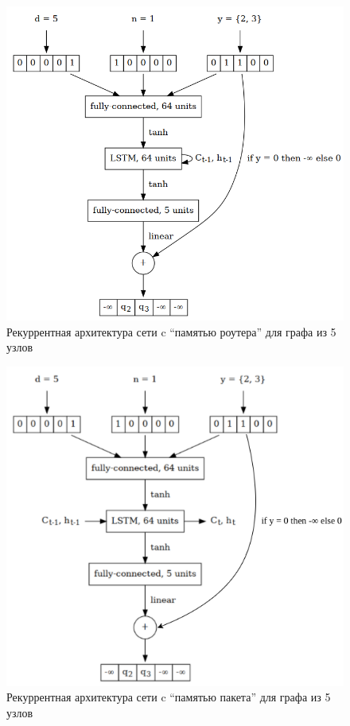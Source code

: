 \documentclass[specification, annotation]{itmo-student-thesis}
\begin{document}
\begin{figure}[!h]
  \caption{Рекуррентная архитектура сети c ``памятью роутера'' для графа из 5
    узлов}\label{nn-pic-lstm-1}
  \centering
  \includegraphics[scale=0.5]{nn-3}
\end{figure}

\begin{figure}[!h]
  \caption{Рекуррентная архитектура сети c ``памятью пакета'' для графа из 5
    узлов}\label{nn-pic-lstm-2}
  \centering
  \includegraphics[scale=0.7]{nn-4-final}
\end{figure}
\end{document}
